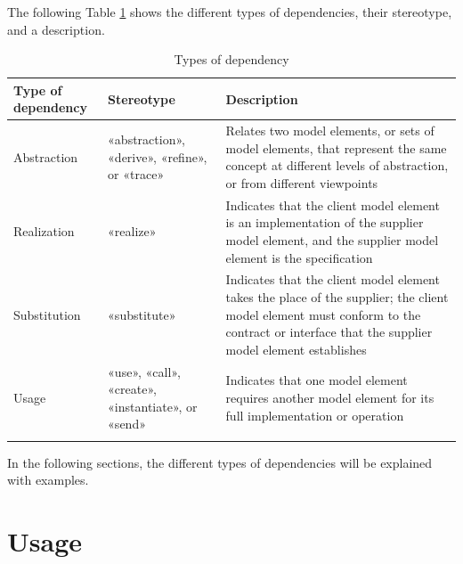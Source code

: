 \documentclass[
	12pt,
    a4paper,
    egregdoesnotlikesansseriftitles, %
    toc=chapterentrywithdots,
    oneside, openany,
    titlepage,
    parskip=half,
    headings=normal,  %
    listof=totoc,
    bibliography=totocnumbered,
    index=totoc,
    captions=tableheading,  %
    listof=flat,
    numbers=noenddot, %
    final]
    {scrbook}
\begin{document}
The following Table \ref{tab:dependencies} shows the different types of dependencies, their stereotype, and a description.

\vspace{1em}
{\RaggedRight
\begin{longtable} {|p{3.5cm}|p{3.25cm}|p{6.5cm}|}
		\hline
		\textbf{Type of dependency} & \textbf{Stereotype} & \textbf{Description} \\
		\hline
		Abstraction & «abstraction», «derive», «refine», or «trace» & Relates two model elements, or sets of model elements, that represent the same concept at different levels of abstraction, or from different viewpoints  \\ 
		\hline
		Realization & «realize» & 	Indicates that the client model element is an implementation of the supplier model element, and the supplier model element is the specification \\ 
		\hline
		Substitution & «substitute» & Indicates that the client model element takes the place of the supplier; the client model element must conform to the contract or interface that the supplier model element establishes  \\ 
		\hline
		Usage & «use», «call», «create», «instantiate», or «send» & Indicates that one model element requires another model element for its full implementation or operation  \\ 
		\hline
	\caption[Types of dependencies]{Types of dependency \cite{ibm_dependencies} \cite{uml}}
	\label{tab:dependencies}
\end{longtable}
}

In the following sections, the different types of dependencies will be explained with examples.

\section{Usage}
\end{document}
